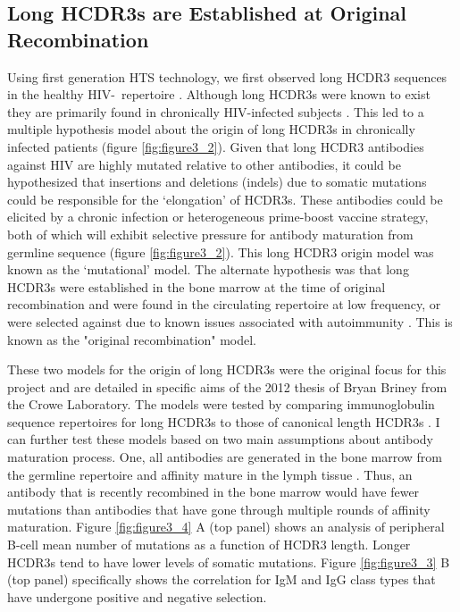 \subsection{Long HCDR3s are Established at Original Recombination}
Using first generation HTS technology, we first observed long HCDR3 sequences in the healthy HIV-\naive~repertoire \citep{Briney:2012ib}. Although long HCDR3s were known to exist \citep{Zemlin:2003jn,Ivanov:2005uu} they are primarily found in chronically HIV-infected subjects \citep{Walker:2009cd,Spurrier:2011ia,Choe:2003un,Walker:2011ew}. This led to a multiple hypothesis model about the origin of long HCDR3s in chronically infected patients (figure \ref{fig:figure3_2}). Given that long HCDR3 antibodies against HIV are highly mutated relative to other antibodies, it could be hypothesized that insertions and deletions (indels) due to somatic mutations could be responsible for the `elongation' of HCDR3s. These antibodies could be elicited by a chronic infection or heterogeneous prime-boost vaccine strategy, both of which will exhibit selective pressure for antibody maturation from germline sequence (figure \ref{fig:figure3_2}). This long HCDR3 origin model was known as the `mutational' model. The alternate hypothesis was that long HCDR3s were established in the bone marrow at the time of original recombination and were found in the circulating repertoire at low frequency, or were selected against due to known issues associated with autoimmunity \citep{Aguilera:2001uo,Wardemann:2003km,Ichiyoshi:1994wb,Crouzier:1995ua}. This is known as the "original recombination" model.

These two models for the origin of long HCDR3s were the original focus for this project and are detailed in specific aims of the 2012 thesis of Bryan Briney from the Crowe Laboratory. The models were tested by comparing immunoglobulin sequence repertoires for long HCDR3s to those of canonical length HCDR3s \citep{Briney:2012tg}. I can further test these models based on two main assumptions about antibody maturation process. One, all antibodies are generated in the bone marrow from the germline repertoire and affinity mature in the lymph tissue \citep{Tonegawa:1983vw,Murphy:2007tl}. Thus, an antibody that is recently recombined in the bone marrow would have fewer mutations than antibodies that have gone through multiple rounds of affinity maturation.  Figure \ref{fig:figure3_4} A (top panel) shows an analysis of peripheral B-cell mean number of mutations as a function of HCDR3 length. Longer HCDR3s tend to have lower levels of somatic mutations. Figure \ref{fig:figure3_3} B (top panel) specifically shows the correlation for IgM and IgG class types that have undergone positive and negative selection.

